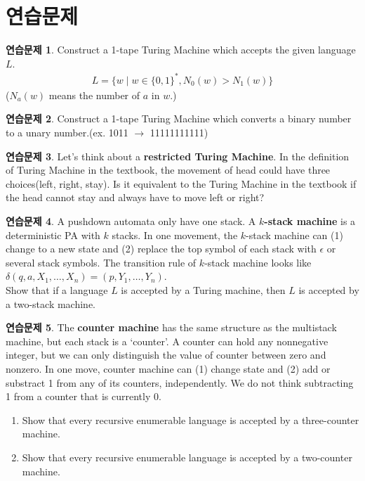 \documentclass[b5paper, 11pt]{book}
\theoremstyle{definition}
\newtheorem{ec}{연습문제}[chapter]
\begin{document}
\section{연습문제}
\begin{ec}
    Construct a 1-tape Turing Machine which accepts the given language $L$.
    \begin{align*}
        L = \{w \;\vert\; w \in \{0,1\}^*, N_0(w) > N_1(w) \}
    \end{align*}
    ($N_a(w)$ means the number of $a$ in $w$.)
\end{ec}
\begin{ec}
    Construct a 1-tape Turing Machine which converts a binary number to 
    a unary number.(ex. 1011 $\rightarrow$ 11111111111)
\end{ec}
\begin{ec}
    Let's think about a \textbf{restricted Turing Machine}. 
    In the definition of Turing Machine in the textbook, 
    the movement of head could have three choices(left, right, stay). 
    Is it equivalent to the Turing Machine in the textbook if the head 
    cannot stay and always have to move left or right?
\end{ec}
\begin{ec}
    A pushdown automata only have one stack. A \textbf{$k$-stack machine} is 
    a deterministic PA with $k$ stacks. In one movement, the $k$-stack machine 
    can (1) change to a new state and (2) replace the top symbol of each stack
     with $\epsilon$ or several stack symbols. The transition rule of $k$-stack
      machine looks like $\delta(q, a, X_1, \ldots, X_n) = (p, Y_1, \ldots, Y_n)$.
    \\
    Show that if a language $L$ is accepted by a Turing machine, then $L$ is
     accepted by a two-stack machine.
\end{ec}
\begin{ec}
    The \textbf{counter machine} has the same structure as the multistack machine, 
    but each stack is a `counter'. A counter can hold any nonnegative integer, but 
    we can only distinguish the value of counter between zero and nonzero. In one
     move, counter machine can (1) change state and (2) add or substract 1 from any
      of its counters, independently. We do not think subtracting 1 from a counter 
      that is currently 0. 
      \begin{enumerate}
        \item Show that every recursive enumerable language is accepted by 
        a three-counter machine.
        \item Show that every recursive enumerable language is accepted by 
        a two-counter machine.
      \end{enumerate}
\end{ec}
\end{document}
